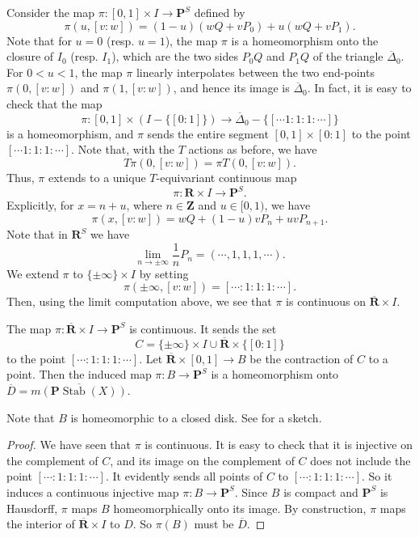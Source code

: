 \documentclass{amsart}
\begin{document}
Consider the map \(\pi \colon [0,1] \times I \to \mathbf{P}^S\) defined by
\[ \pi(u,[v:w]) = (1-u)(wQ + vP_0) + u (wQ + vP_1).\]
Note that for  \(u = 0\) (resp. \(u = 1\)), the map \(\pi\) is a homeomorphism onto the closure of \(I_0\) (resp. \(I_1\)), which are the two sides \(P_{0}Q\) and \(P_1Q\) of the triangle \(\overline{\Delta}_0\).
For \(0 < u < 1\), the map \(\pi\) linearly interpolates between the two end-points \(\pi(0,[v:w])\) and \(\pi(1,[v:w])\), and hence its image is \(\overline \Delta_0\).
In fact, it is easy to check that the map
\[ \pi \colon [0,1] \times \left(I - \{[0:1]\}\right) \to \overline \Delta_0 - \{[\cdots 1 : 1: 1: \cdots]\}\]
is a homeomorphism, and \(\pi\) sends the entire segment \([0,1] \times [0:1]\) to the point \([\cdots 1 : 1: 1: \cdots]\).
Note that, with the \(T\) actions as before, we have
\[ T \pi(0,[v:w]) = \pi T(0,[v:w]).\]
Thus, \(\pi\) extends to a unique \(T\)-equivariant continuous map
\[ \pi \colon \mathbf{R} \times I \to \mathbf{P}^S.\]
Explicitly, for \(x = n + u\), where \(n \in \mathbf{Z}\) and \(u \in [0,1)\), we have
\[ \pi(x,[v:w]) = w Q + (1-u) v P_n + uvP_{n+1}.\]
Note that in \(\mathbf{R}^S\) we have
\[ \lim_{n \to \pm\infty} \frac{1}{n}P_n = (\cdots, 1, 1, 1, \cdots).\]
We extend \(\pi\) to \(\{\pm \infty\} \times I\) by setting
\[ \pi(\pm \infty, [v:w]) = [\cdots : 1 : 1 : 1 : \cdots].\]
Then, using the limit computation above, we see that \(\pi\) is continuous on \(\overline{\mathbf{R}} \times I\).
\begin{theorem}\label{prop:pi}
  The map \(\pi \colon \overline{\mathbf{R}} \times I \to \mathbf{P}^S\) is continuous.
  It sends the set \[C = \{\pm \infty\} \times I \cup \overline{\mathbf{R}} \times \{[0:1]\}\]
  to the point \([\cdots: 1: 1: 1: \cdots]\).
  Let \(\overline{\mathbf{R}} \times [0,1] \to B\) be the contraction of \(C\) to a point.
  Then the induced map \(\pi \colon B \to \mathbf{P}^S\) is a homeomorphism onto \(\overline D = \overline{m(\mathbf{P}\operatorname{Stab}(X))}\).
\end{theorem}
Note that \(B\) is homeomorphic to a closed disk.
See  for a sketch.
\begin{proof}
  We have seen that \(\pi\) is continuous.
  It is easy to check that it is injective on the complement of \(C\), and its image on the complement of \(C\) does not include the point \([\cdots: 1:1:1: \cdots]\).
  It evidently sends all points of \(C\) to \([\cdots: 1:1:1: \cdots]\).
  So it induces a continuous injective map \(\pi \colon B \to \mathbf{P}^S\).
  Since \(B\) is compact and \(\mathbf{P}^S\) is Hausdorff, \(\pi\) maps \(B\) homeomorphically onto its image.
  By construction, \(\pi\) maps the interior of \(\overline{\mathbf{R}} \times I\) to \(D\).
  So \(\pi(B)\) must be \(\overline D\).
\end{proof}
\end{document}
